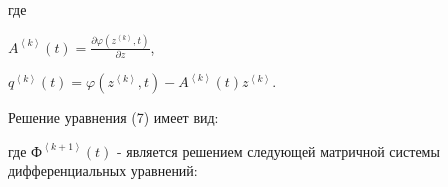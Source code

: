 
где

\(A^{\left\langle k \right\rangle}(t) = \frac{\partial\varphi(z^{\left\langle k \right\rangle},t)}{\partial z}\),

\(q^{\left\langle k \right\rangle}(t) = \varphi\left( z^{\left\langle k \right\rangle},t \right) - A^{\left\langle k \right\rangle}(t)z^{\left\langle k \right\rangle}\).

Решение уравнения (7) имеет вид:

% 

где \(Ф^{\left\langle k + 1 \right\rangle}(t)\) - является решением
следующей матричной системы дифференциальных уравнений:

